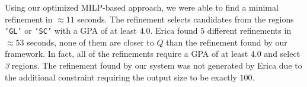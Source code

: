{Using our optimized MILP-based approach, we were able to find a minimal refinement in $\approx 11$ seconds. The refinement selects candidates from the regions {\tt `GL'} or {\tt `SC'} with a GPA of at least $4.0$. Erica found $5$ different refinements in $\approx 53$ seconds, none of them are closer to $Q$ than the refinement found by our framework. In fact, all of the refinements require a GPA of at least $4.0$ and select {\it 3} regions. The refinement found by our system was not generated by Erica due to the additional constraint requiring the output size to be exactly $100$.}



